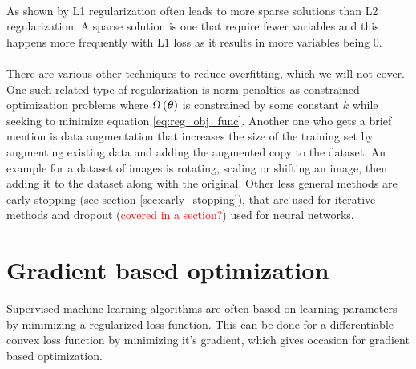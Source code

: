 \\
As shown by \cite{Goodfellow-et-al-2016} L1 regularization often leads to more sparse solutions than L2 regularization. A sparse solution is one that require fewer variables and this happens more frequently with L1 loss as it results in more variables being 0.\\
\\
There are various other techniques to reduce overfitting, which we will not cover. One such related type of regularization is norm penalties as constrained optimization problems where $\Omega \left (\boldsymbol{\theta}\right)$ is constrained by some constant $k$ while seeking to minimize equation \ref{eq:reg_obj_func}. Another one who gets a brief mention is data augmentation that increases the size of the training set by augmenting existing data and adding the augmented copy to the dataset. An example for a dataset of images is rotating, scaling or shifting an image, then adding it to the dataset along with the original. Other less general methods are early stopping (see section \ref{sec:early_stopping}), that are used for iterative methods and dropout (\textcolor{red}{covered in a section?}) used for neural networks. 


\section{Gradient based optimization} 
Supervised machine learning algorithms are often based on learning parameters by minimizing a regularized loss function. This can be done for a differentiable convex loss function by minimizing it's gradient, which gives occasion for gradient based optimization. 

